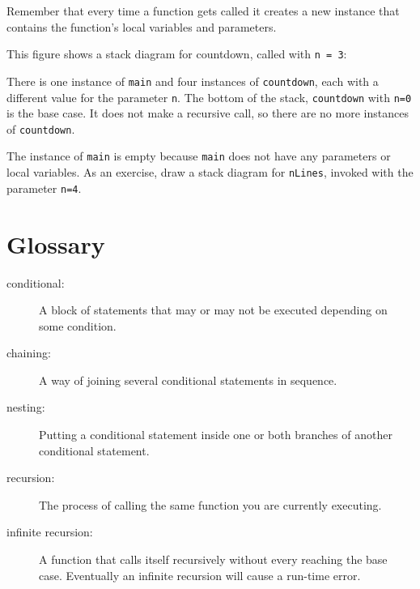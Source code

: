 Remember that every time a function gets called it creates
a new instance that contains
the function's local variables and parameters.

This figure shows a stack diagram for countdown, called
with {\tt n = 3}:

\vspace{0.1in}
\centerline{}
\vspace{0.1in}
%
There is one instance of {\tt main} and four instances of
{\tt countdown}, each with a different value for the parameter
{\tt n}.  The bottom of the stack, {\tt countdown} with {\tt n=0}
is the base case.  It does not make a recursive call, so there
are no more instances of {\tt countdown}.

The instance of {\tt main} is empty because {\tt main} does not
have any parameters or local variables.  As an exercise, draw a
stack diagram for {\tt nLines}, invoked with the parameter {\tt n=4}.


\section{Glossary}

\begin{description}

\item[conditional:]  A block of statements that may or may not
be executed depending on some condition.

\item[chaining:]  A way of joining several conditional statements
in sequence.

\item[nesting:] Putting a conditional statement inside one or both
branches of another conditional statement.

\item[recursion:]  The process of calling the same function you
are currently executing.

\item[infinite recursion:]  A function that calls itself
recursively without every reaching the base case.  Eventually
an infinite recursion will cause a run-time error.


\end{description}


